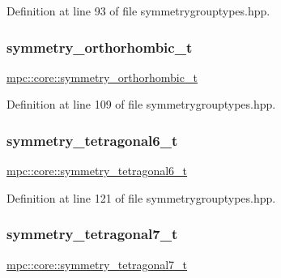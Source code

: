 Definition at line 93 of file symmetrygrouptypes.\+hpp.

\mbox{\label{namespacempc_1_1core_a4eef5d2c2b920fd8250780f64555fe56}} 
\subsubsection{\texorpdfstring{symmetry\+\_\+orthorhombic\+\_\+t}{symmetry\_orthorhombic\_t}}
{\footnotesize\ttfamily \mbox{\hyperlink{namespacempc_1_1core_a4eef5d2c2b920fd8250780f64555fe56}{mpc\+::core\+::symmetry\+\_\+orthorhombic\+\_\+t}}}



Definition at line 109 of file symmetrygrouptypes.\+hpp.

\mbox{\label{namespacempc_1_1core_abb8eb7f886d1f203879263524d6b8ecb}} 
\subsubsection{\texorpdfstring{symmetry\+\_\+tetragonal6\+\_\+t}{symmetry\_tetragonal6\_t}}
{\footnotesize\ttfamily \mbox{\hyperlink{namespacempc_1_1core_abb8eb7f886d1f203879263524d6b8ecb}{mpc\+::core\+::symmetry\+\_\+tetragonal6\+\_\+t}}}



Definition at line 121 of file symmetrygrouptypes.\+hpp.

\mbox{\label{namespacempc_1_1core_a79a28757f34cb27302c53b368452329c}} 
\subsubsection{\texorpdfstring{symmetry\+\_\+tetragonal7\+\_\+t}{symmetry\_tetragonal7\_t}}
{\footnotesize\ttfamily \mbox{\hyperlink{namespacempc_1_1core_a79a28757f34cb27302c53b368452329c}{mpc\+::core\+::symmetry\+\_\+tetragonal7\+\_\+t}}}



